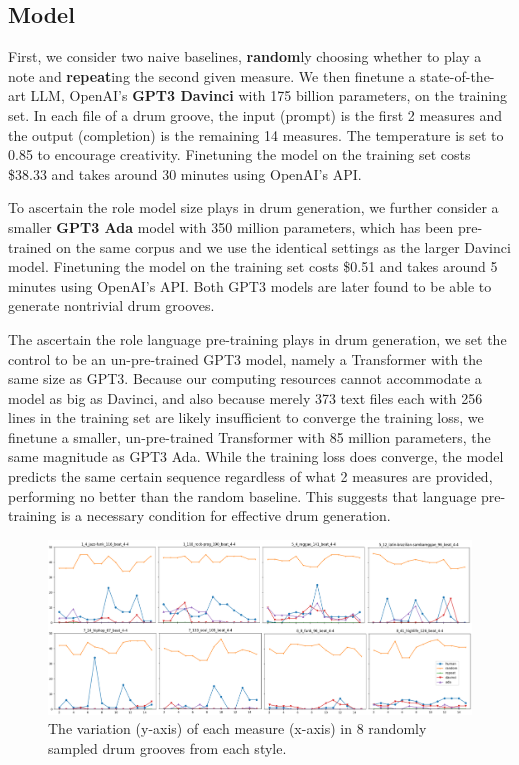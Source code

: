 \documentclass[letterpaper]{article} %
\begin{document}
\subsection{Model}
First, we consider two naive baselines, \textbf{random}ly choosing whether to play a note and \textbf{repeat}ing the second given measure. We then finetune a state-of-the-art LLM, OpenAI's \textbf{GPT3 Davinci} with 175 billion parameters, on the training set. In each file of a drum groove, the input (prompt) is the first 2 measures and the output (completion) is the remaining 14 measures. The temperature is set to 0.85 to encourage creativity. Finetuning the model on the training set costs \$38.33 and takes around 30 minutes using OpenAI's API.

To ascertain the role model size plays in drum generation, we further consider a smaller \textbf{GPT3 Ada} model with 350 million parameters, which has been pre-trained on the same corpus and we use the identical settings as the larger Davinci model. Finetuning the model on the training set costs \$0.51 and takes around 5 minutes using OpenAI's API. Both GPT3 models are later found to be able to generate nontrivial drum grooves.

The ascertain the role language pre-training plays in drum generation, we set the control to be an un-pre-trained GPT3 model, namely a Transformer \cite{NIPS2017_3f5ee243} with the same size as GPT3. Because our computing resources cannot accommodate a model as big as Davinci, and also because merely 373 text files each with 256 lines in the training set are likely insufficient to converge the training loss, we finetune a smaller, un-pre-trained Transformer with 85 million parameters, the same magnitude as GPT3 Ada. While the training loss does converge, the model predicts the same certain sequence regardless of what 2 measures are provided, performing no better than the random baseline. This suggests that language pre-training is a necessary condition for effective drum generation.
\begin{figure}[t!]
\centering
\includegraphics[scale=0.55]{images/structure.png}
\caption{The variation (y-axis) of each measure (x-axis) in 8 randomly sampled drum grooves from each style.}
\label{fig:repetition_variation}
\end{figure}
\end{document}
